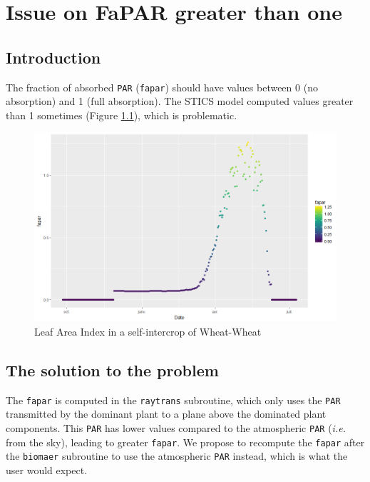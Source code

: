 \documentclass[]{book}
\begin{document}
\hypertarget{FAPARissue}{%
\chapter{Issue on FaPAR greater than one}\label{FAPARissue}}

\hypertarget{introduction-6}{%
\section{Introduction}\label{introduction-6}}

The fraction of absorbed \texttt{PAR} (\texttt{fapar}) should have values between 0 (no absorption) and 1 (full absorption). The STICS model computed values greater than 1 sometimes (Figure \ref{fig:FAPARhigh}), which is problematic.

\begin{figure}
\centering
\includegraphics{img/FAPARhigh.png}
\caption{\label{fig:FAPARhigh}Leaf Area Index in a self-intercrop of Wheat-Wheat}
\end{figure}

\hypertarget{the-solution-to-the-problem}{%
\section{The solution to the problem}\label{the-solution-to-the-problem}}

The \texttt{fapar} is computed in the \texttt{raytrans} subroutine, which only uses the \texttt{PAR} transmitted by the dominant plant to a plane above the dominated plant components. This \texttt{PAR} has lower values compared to the atmospheric \texttt{PAR} (\emph{i.e.} from the sky), leading to greater \texttt{fapar}.
We propose to recompute the \texttt{fapar} after the \texttt{biomaer} subroutine to use the atmospheric \texttt{PAR} instead, which is what the user would expect.
\end{document}
